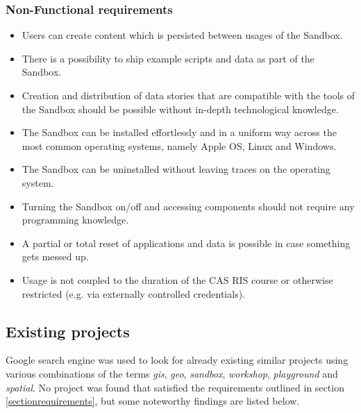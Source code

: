 \documentclass[11pt, a4paper, oneside, parskip=full-]{scrartcl}
\begin{document}
\subsubsection{Non-Functional requirements}
\begin{itemize}
  \item Users can create content which is persisted between usages of the
  Sandbox.
  \item There is a possibility to ship example scripts and data as part of the
  Sandbox.
  \item Creation and distribution of data stories that are compatible with the
  tools of the Sandbox should be possible without in-depth technological
  knowledge.
  \item The Sandbox can be installed effortlessly and in a uniform way across
  the most common operating systems, namely Apple OS, Linux and Windows.
  \item The Sandbox can be uninstalled without leaving traces on the operating
  system.
  \item Turning the Sandbox on/off and accessing components should not require
  any programming knowledge.
  \item A partial or total reset of applications and data is possible in case
  something gets messed up.
  \item Usage is not coupled to the duration of the CAS RIS course or otherwise
  restricted (e.g. via externally controlled credentials).
\end{itemize}

\subsection{Existing projects}
Google search engine was used to look for already existing similar projects
using various combinations of the terms \emph{gis}, \emph{geo}, \emph{sandbox},
\emph{workshop}, \emph{playground} and \emph{spatial}. No project was found that
satisfied the requirements outlined in section \ref{sectionrequirements}, but
some noteworthy findings are listed below.
\end{document}
